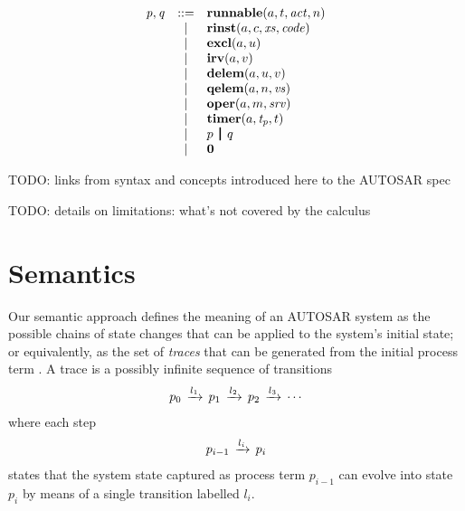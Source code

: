 \documentclass[twocolumn]{article}
\begin{document}
\[
\begin{array}{rcll}
  \V{P},\V{Q}   
  		& ::= & \Trunnable a t {\Act} n	                \\
        & |   & \Trinst a c {\Xs} {\Code}               \\
        & |   & \Texcl a u                              \\
        & |   & \Tirv a v                               \\
        & |   & \Tdelem a u v                           \\
        & |   & \Tqelem a n {\Vs}                       \\
        & |   & \Toper a m \Srv                         \\
        & |   & \Ttimer a {\V{T_p}} t                   \\
        & |   & \Tpar p q                               \\
        & |	  & \Tzero									\\
\end{array}
\]

TODO: links from syntax and concepts introduced here to the AUTOSAR spec

TODO: details on limitations: what's not covered by the calculus


\section{Semantics}
\label{sec:Sem}

Our semantic approach defines the meaning of an AUTOSAR system as the possible chains of state changes that can be applied to the system's initial state; or equivalently, as the set of \emph{traces} that can be generated from the initial process term . A trace is a possibly infinite sequence of transitions
\[
\begin{array}{c}
  {p_0} \,\xrightarrow{l_1}\, {p_1} \,\xrightarrow{l_2}\, {p_2} \,\xrightarrow{l_3}\, \cdots
\end{array}
\]
where each step
\[
\begin{array}{c}
  {p_{i-1}} \,\xrightarrow{l_i}\, {p_i}
\end{array}
\]
states that the system state captured as process term $p_{i-1}$ can evolve into state $p_i$ by means of a single transition labelled $l_i$.
\end{document}
